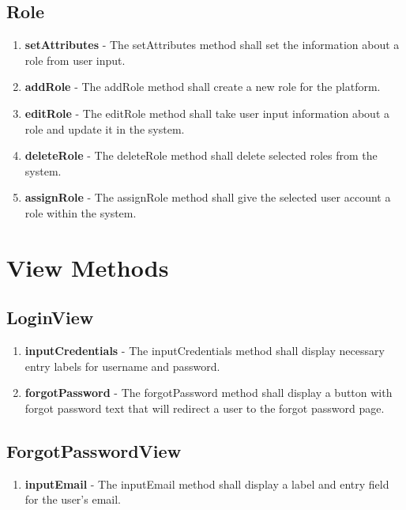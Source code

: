 \documentclass[letterpaper,12pt,oneside,listof=totoc]{scrreprt}
\begin{document}
\subsection{Role}
\begin{enumerate}
    \item \textbf{setAttributes} - The setAttributes method shall set the information about a role from user input.
    \item \textbf{addRole} - The addRole method shall create a new role for the platform.
    \item \textbf{editRole} - The editRole method shall take user input information about a role and update it in the system.
    \item \textbf{deleteRole} - The deleteRole method shall delete selected roles from the system.
    \item \textbf{assignRole} - The assignRole method shall give the selected user account a role within the system.
\end{enumerate}

\section{View Methods}

\subsection{LoginView}
\begin{enumerate}
    \item \textbf{inputCredentials} - The inputCredentials method shall display necessary entry labels for username and password.
    \item \textbf{forgotPassword} - The forgotPassword method shall display a button with forgot password text that will redirect a user to the forgot password page.
\end{enumerate}

\subsection{ForgotPasswordView}
\begin{enumerate}
    \item \textbf{inputEmail} - The inputEmail method shall display a label and entry field for the user's email.
\end{enumerate}
\end{document}
